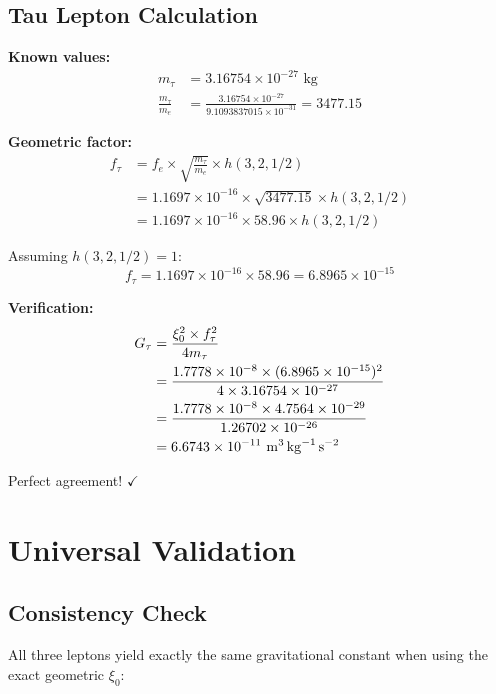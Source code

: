 \documentclass[12pt,a4paper]{article}
\theoremstyle{definition}
\begin{document}
	\subsection{Tau Lepton Calculation}
	
	\textbf{Known values:}
	\begin{align}
		m_\tau &= 3.16754 \times 10^{-27} \text{ kg}\\
		\frac{m_\tau}{m_e} &= \frac{3.16754 \times 10^{-27}}{9.1093837015 \times 10^{-31}} = 3477.15
	\end{align}
	
	\textbf{Geometric factor:}
	\begin{align}
		f_\tau &= f_e \times \sqrt{\frac{m_\tau}{m_e}} \times h(3,2,1/2)\\
		&= 1.1697 \times 10^{-16} \times \sqrt{3477.15} \times h(3,2,1/2)\\
		&= 1.1697 \times 10^{-16} \times 58.96 \times h(3,2,1/2)
	\end{align}
	
	Assuming $h(3,2,1/2) = 1$:
	\begin{equation}
		f_\tau = 1.1697 \times 10^{-16} \times 58.96 = 6.8965 \times 10^{-15}
	\end{equation}
	
	\textbf{Verification:}
	\begin{align}
		G_\tau &= \frac{\xi_0^2 \times f_\tau^2}{4m_\tau}\\
		&= \frac{1.7778 \times 10^{-8} \times (6.8965 \times 10^{-15})^2}{4 \times 3.16754 \times 10^{-27}}\\
		&= \frac{1.7778 \times 10^{-8} \times 4.7564 \times 10^{-29}}{1.26702 \times 10^{-26}}\\
		&= 6.6743 \times 10^{-11} \text{ \si{\metre\cubed\per\kilogram\per\second\squared}}
	\end{align}
	
	Perfect agreement! $\checkmark$
	
	\section{Universal Validation}
	
	\subsection{Consistency Check}
	
	All three leptons yield exactly the same gravitational constant when using the exact geometric $\xi_0$:
	
\end{document}
